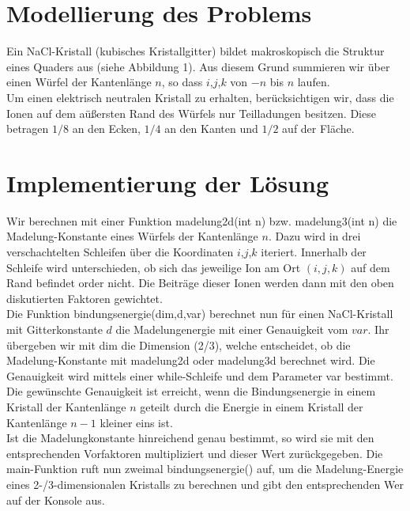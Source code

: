\documentclass[ngerman]{scrartcl}
\begin{document}
\section*{Modellierung des Problems}
Ein NaCl-Kristall (kubisches Kristallgitter) bildet makroskopisch die Struktur eines Quaders aus (siehe Abbildung 1).
Aus diesem Grund summieren wir über einen Würfel der Kantenlänge $n$, so dass $i$,$j$,$k$ von $-n$ bis $n$ laufen.\\
Um einen elektrisch neutralen Kristall zu erhalten, berücksichtigen wir, dass die Ionen auf dem aüßersten Rand
des Würfels nur Teilladungen besitzen. Diese betragen $ 1/8 $ an den Ecken, $ 1/4 $ an den Kanten und $ 1/2 $ auf der Fläche.



\section*{Implementierung der Lösung}
Wir berechnen mit einer Funktion madelung2d(int n)  bzw. madelung3(int n) die Madelung-Konstante eines Würfels der Kantenlänge $n$.
Dazu wird in drei verschachtelten Schleifen über die Koordinaten $i$,$j$,$k$ iteriert. Innerhalb der Schleife wird unterschieden,
ob sich das jeweilige Ion am Ort $(i,j,k)$ auf dem Rand befindet order nicht.
Die Beiträge dieser Ionen werden dann mit den oben diskutierten Faktoren gewichtet.\\

Die Funktion bindungsenergie(dim,d,var) berechnet nun für einen NaCl-Kristall mit Gitterkonstante $d$ die Madelungenergie mit einer Genauigkeit vom $var$.
Ihr übergeben wir mit dim die Dimension (2/3), welche entscheidet, ob die Madelung-Konstante
mit madelung2d oder madelung3d berechnet wird.
Die Genauigkeit wird mittels einer while-Schleife und dem Parameter var bestimmt. Die gewünschte Genauigkeit ist erreicht, wenn die Bindungsenergie in einem Kristall der Kantenlänge $n$ geteilt durch die Energie in einem Kristall der Kantenlänge $n-1$ kleiner eins ist.\\

Ist die Madelungkonstante hinreichend genau bestimmt, so wird sie mit den entsprechenden Vorfaktoren multipliziert und dieser Wert zurückgegeben.
Die main-Funktion ruft nun zweimal bindungsenergie() auf, um die Madelung-Energie eines 2-/3-dimensionalen Kristalls zu berechnen und
gibt den entsprechenden Wer auf der Konsole aus.
\end{document}
